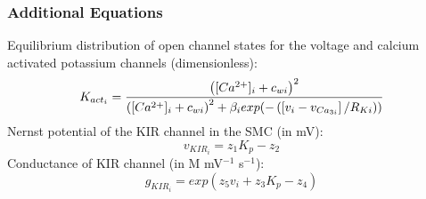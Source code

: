 \subsubsection*{Additional Equations}
%
Equilibrium distribution of open channel states for the voltage and calcium activated potassium channels (dimensionless):
\begin{equation} \label{eq:Kacti}
K_{act_{i}}= \frac{  \left( [Ca^{2+}]_{i} + c_{wi}\right)^{2}}    {\left( [Ca^{2+}]_{i} + c_{wi} \right)^{2}    + \beta_{i} exp( -\left(   \left[ v_{i}-v_{Ca_{3i}}\right] /R_{Ki}   \right) )      }
\end{equation}
%
Nernst potential of the KIR channel in the SMC (in mV):
\begin{equation}\label{eq:vKIR}
v_{KIR_i} = z_1 K_p-z_2
\end{equation}
%
Conductance of KIR channel (in  \textmu M mV$^{-1}$ s$^{-1}$):
\begin{equation}\label{eq:gKIR}
g_{KIR_i} = exp(z_5v_i +z_3 K_p - z_4)
\end{equation}
%
%
%
